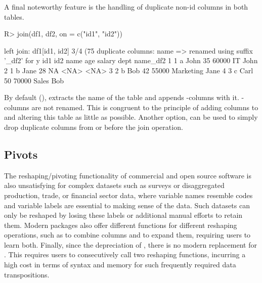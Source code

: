 \documentclass[article]{jss}
\newcommand{\fct}[1]{\code{#1()}}
\begin{document}
%
A final noteworthy feature is the handling of duplicate non-id columns in both tables.
%
\begin{Schunk}
\begin{Sinput}
R> join(df1, df2, on = c("id1", "id2"))
\end{Sinput}
\begin{Soutput}
left join: df1[id1, id2] 3/4 (75%) <m:m> df2[id1, id2] 3/4 (75%)
duplicate columns: name => renamed using suffix '_df2' for y
  id1 id2 name age salary      dept name_df2
1   1   a John  35  60000        IT     John
2   1   b Jane  28     NA      <NA>     <NA>
3   2   b  Bob  42  55000 Marketing     Jane
4   3   c Carl  50  70000     Sales      Bob
\end{Soutput}
\end{Schunk}
%
By default (), \fct{join} extracts the name of the  table and appends -columns with it. -columns are not renamed. This is congruent to the principle of adding columns to  and altering this table as little as possible. Another option,  can be used to simply drop duplicate columns from  or  before the join operation.
%
\subsection{Pivots}
%
The reshaping/pivoting functionality of commercial and open source software is also unsatisfying for complex datasets such as surveys or disaggregated production, trade, or financial sector data, where variable names resemble codes and variable labels are essential to making sense of the data. Such datasets can only be reshaped by losing these labels or additional manual efforts to retain them. Modern  packages also offer different functions for different reshaping operations, such as  to combine columns and  to expand them, requiring users to learn both. Finally, since the depreciation of  \citep{rreshape2}, there is no modern replacement for . This requires  users to consecutively call two reshaping functions, incurring a high cost in terms of syntax and memory for such frequently required data transpositions. \newline
\end{document}
